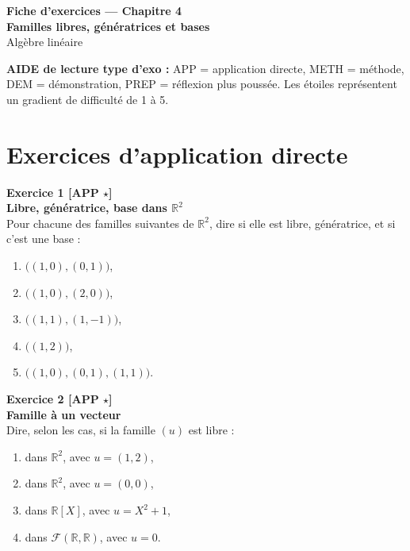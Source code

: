 \documentclass[11pt,a4paper]{article}
\begin{document}
\begin{center}
    {\LARGE \textbf{Fiche d’exercices --- Chapitre 4}}\\[0.4em]
    {\Large \textbf{Familles libres, génératrices et bases}}\\[0.6em]
    Algèbre linéaire
\end{center}

\textbf{AIDE de lecture type d’exo :} APP = application directe, METH = méthode, DEM = démonstration, PREP = réflexion plus poussée. Les étoiles représentent un gradient de difficulté de 1 à 5.

\tableofcontents

\newpage

\section*{Exercices d’application directe}

\textbf{Exercice 1 [APP $\star$]}\\
\textbf{Libre, génératrice, base dans \(\mathbb{R}^2\)}\\
Pour chacune des familles suivantes de \(\mathbb{R}^2\), dire si elle est libre, génératrice, et si c’est une base :
\begin{enumerate}[label=\alph*)]
    \item \(\big((1,0),(0,1)\big)\),
    \item \(\big((1,0),(2,0)\big)\),
    \item \(\big((1,1),(1,-1)\big)\),
    \item \(\big((1,2)\big)\),
    \item \(\big((1,0),(0,1),(1,1)\big)\).
\end{enumerate}

\textbf{Exercice 2 [APP $\star$]}\\
\textbf{Famille à un vecteur}\\
Dire, selon les cas, si la famille \((u)\) est libre :
\begin{enumerate}[label=\alph*)]
    \item dans \(\mathbb{R}^2\), avec \(u=(1,2)\),
    \item dans \(\mathbb{R}^2\), avec \(u=(0,0)\),
    \item dans \(\mathbb{R}[X]\), avec \(u=X^2+1\),
    \item dans \(\mathcal F(\mathbb{R},\mathbb{R})\), avec \(u=0\).
\end{enumerate}
\end{document}
